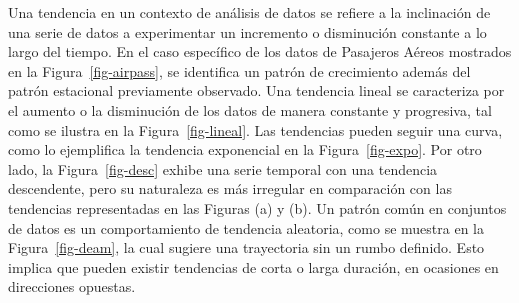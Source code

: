 \documentclass[
  us-letterpaper,
]{scrreprt}
\theoremstyle{definition}
\theoremstyle{plain}
\theoremstyle{plain}
\theoremstyle{definition}
\theoremstyle{remark}
\begin{document}
Una tendencia en un contexto de análisis de datos se refiere a la
inclinación de una serie de datos a experimentar un incremento o
disminución constante a lo largo del tiempo. En el caso específico de
los datos de Pasajeros Aéreos mostrados en la Figura~\ref{fig-airpass},
se identifica un patrón de crecimiento además del patrón estacional
previamente observado. Una tendencia lineal se caracteriza por el
aumento o la disminución de los datos de manera constante y progresiva,
tal como se ilustra en la Figura~\ref{fig-lineal}. Las tendencias pueden
seguir una curva, como lo ejemplifica la tendencia exponencial en la
Figura~\ref{fig-expo}. Por otro lado, la Figura~\ref{fig-desc} exhibe
una serie temporal con una tendencia descendente, pero su naturaleza es
más irregular en comparación con las tendencias representadas en las
Figuras (a) y (b). Un patrón común en conjuntos de datos es un
comportamiento de tendencia aleatoria, como se muestra en la
Figura~\ref{fig-deam}, la cual sugiere una trayectoria sin un rumbo
definido. Esto implica que pueden existir tendencias de corta o larga
duración, en ocasiones en direcciones opuestas.
\end{document}
